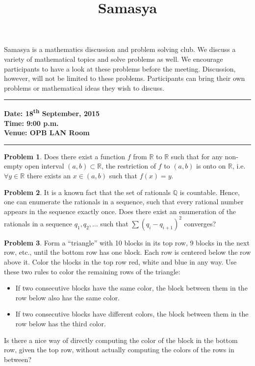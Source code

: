 \documentclass[10pt,a4paper,notitlepage]{article}
\title{\textrm{\textbf{\fontsize{30}{40}\selectfont Samasya}}}
\date{%
    }
\theoremstyle{definition}
\newtheorem{prob}{Problem}
\begin{document}
\maketitle

Samasya is a mathematics discussion and problem solving club.
We discuss a variety of mathematical topics and solve problems as well.
We encourage participants to have a look at these problems%
before the meeting.
Discussion, however, will not be limited to these problems.
Participants can bring their own problems or mathematical ideas they wish to discuss.\\
\hrule

\textbf{Date: 18\textsuperscript{th} September, 2015}%
\\
\textbf{Time: 9:00 p.m.}%
\\
\textbf{Venue: OPB LAN Room}%
\\
\hrule


\begin{prob}
Does there exist a function $f$ from $\mathbb{R}$ to $\mathbb{R}$ such that for any non-empty open interval $(a,b) \subset \mathbb{R}$, the restriction of $f$ to $(a,b)$ is onto on $\mathbb{R}$, i.e. $\forall y \in \mathbb{R}$ there exists an $x \in (a,b)$ such that $f(x)=y$. 
\end{prob}

\begin{prob}
It is a known fact that the set of rationals $\mathbb{Q}$ is countable. Hence, one can enumerate the rationals in a sequence, such that every rational number appears in the sequence exactly once. Does there exist an enumeration of the rationals in a sequence $q_1, q_2, \ldots$ such that $\sum (q_i-q_{i+1})^2$ converges?
\end{prob}

\begin{prob}
Form a “triangle” with 10 blocks in its top row, 9 blocks in
the next row, etc., until the bottom row has one block. Each
row is centered below the row above it. Color the blocks in
the top row red, white and blue in any way. Use these two
rules to color the remaining rows of the triangle:
\begin{itemize}
\item If two consecutive blocks have the same color, the block
between them in the row below also has the same color.
\item If two consecutive blocks have different colors, the block
between them in the row below has the third color.
\end{itemize}
Is there a nice way of directly computing the color of the block
in the bottom row, given the top row, without actually computing the
colors of the rows in between?
\end{prob}
\end{document}
